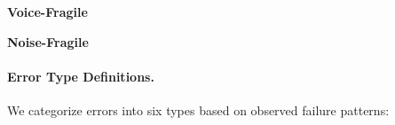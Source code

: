 \begin{table}[h]
\caption{Qualitative error annotations for sampled task completion failures. Left: Voice-Fragile cohort (failures from Clean audio setting, 20 tasks). Right: Noise-Fragile cohort (failures from Realistic audio setting, 20 tasks).}
\label{tab:full-notes-both}
\centering
\begin{small}
\begin{minipage}{0.48\textwidth}
\centering
\textbf{Voice-Fragile}\\[0.5em]

\end{minipage}
\hfill
\begin{minipage}{0.48\textwidth}
\centering
\textbf{Noise-Fragile}\\[0.5em]

\end{minipage}
\end{small}
\end{table}

\paragraph{Error Type Definitions.}
We categorize errors into six types based on observed failure patterns:

